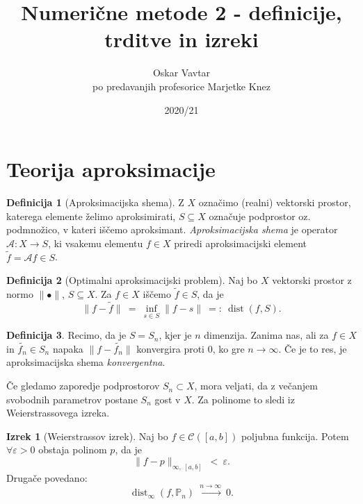 \documentclass[11pt]{article}
\title{Numerične metode 2 - definicije, trditve in izreki}
\author{Oskar Vavtar \\
po predavanjih profesorice Marjetke Knez}
\date{2020/21}
\DeclareMathOperator{\dist}{dist}
\newcommand{\p}{\mathbb{P}}
\newcommand{\A}{\mathcal{A}}
\newcommand{\C}{\mathcal{C}}
\theoremstyle{definition}
\newtheorem{definicija}{Definicija}[section]
\theoremstyle{definition}
\newtheorem{izrek}{Izrek}
\begin{document}
\maketitle
\pagebreak
\tableofcontents
\pagebreak


\section{Teorija aproksimacije}
\vspace{0.5cm}

\begin{definicija}[Aproksimacijska shema]

Z $X$ označimo (realni) vektorski prostor, katerega elemente želimo aproksimirati, $S \subseteq X$ označuje podprostor oz. podmnožico, v kateri iščemo aproksimant. \textit{Aproksimacijska shema} je operator $\A: X \rightarrow S$, ki vsakemu elementu $f \in X$ priredi aproksimacijski element $\tilde{f} = \A f \in S$.

\end{definicija}
\vspace{0.5cm}

\begin{definicija}[Optimalni aproksimacijski problem]

Naj bo $X$ vektorski prostor z normo $\|\bullet\|$, $S \subseteq X$. Za $f \in X$ iščemo $\tilde{f} \in S$, da je 
$$\|f - \tilde{f}\| ~=~ \inf_{s \in S}{\|f - s\|} ~=:~ \dist(f, S).$$

\end{definicija}
\vspace{0.5cm}

\begin{definicija}

Recimo, da je $S = S_n$, kjer je $n$ dimenzija. Zanima nas, ali za $f \in X$ in $\tilde{f_n} \in S_n$ napaka $\|f - \tilde{f_n}\|$ konvergira proti $0$, ko gre $n \rightarrow \infty$. Če je to res, je aproksimacijska shema \textit{konvergentna}.

Če gledamo zaporedje podprostorov $S_n \subset X$, mora veljati, da z večanjem svobodnih parametrov postane $S_n$ gost v $X$. Za polinome to sledi iz Weierstrassovega izreka.

\end{definicija}
\vspace{0.5cm}

\begin{izrek}[Weierstrassov izrek]

Naj bo $f \in \C([a, b])$ poljubna funkcija. Potem $\forall \varepsilon > 0$ obstaja polinom $p$, da je 
$$\|f - p\|_{\infty,~[a, b]} ~<~ \varepsilon.$$
Drugače povedano:
$$\dist_{\infty}(f, \p_n) ~\xrightarrow{n \rightarrow \infty}~ 0.$$

\end{izrek}
\vspace{0.5cm}
\end{document}
